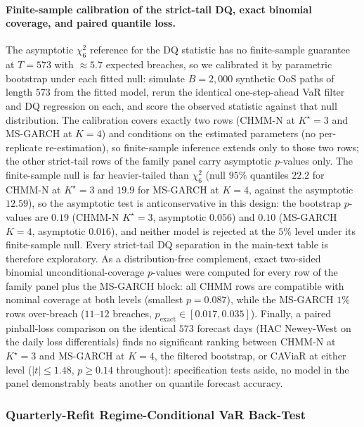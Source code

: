 \paragraph{Finite-sample calibration of the strict-tail DQ, exact binomial coverage, and paired quantile loss.}
The asymptotic $\chi^2_6$ reference for the DQ statistic has no finite-sample guarantee at $T = 573$ with $\approx 5.7$ expected breaches, so we calibrated it by parametric bootstrap under each fitted null: simulate $B = 2{,}000$ synthetic OoS paths of length $573$ from the fitted model, rerun the identical one-step-ahead VaR filter and DQ regression on each, and score the observed statistic against that null distribution. The calibration covers exactly two rows (CHMM-N at $K^\star = 3$ and MS-GARCH at $K = 4$) and conditions on the estimated parameters (no per-replicate re-estimation), so finite-sample inference extends only to those two rows; the other strict-tail rows of the family panel carry asymptotic $p$-values only. The finite-sample null is far heavier-tailed than $\chi^2_6$ (null $95\%$ quantiles $22.2$ for CHMM-N at $K^\star = 3$ and $19.9$ for MS-GARCH at $K = 4$, against the asymptotic $12.59$), so the asymptotic test is anticonservative in this design: the bootstrap $p$-values are $0.19$ (CHMM-N $K^\star = 3$, asymptotic $0.056$) and $0.10$ (MS-GARCH $K = 4$, asymptotic $0.016$), and neither model is rejected at the $5\%$ level under its finite-sample null. Every strict-tail DQ separation in the main-text table is therefore exploratory. As a distribution-free complement, exact two-sided binomial unconditional-coverage $p$-values were computed for every row of the family panel plus the MS-GARCH block: all CHMM rows are compatible with nominal coverage at both levels (smallest $p = 0.087$), while the MS-GARCH $1\%$ rows over-breach ($11$--$12$ breaches, $p_{\text{exact}} \in [0.017, 0.035]$). Finally, a paired pinball-loss comparison on the identical $573$ forecast days (HAC Newey-West on the daily loss differentials) finds no significant ranking between CHMM-N at $K^\star = 3$ and MS-GARCH at $K = 4$, the filtered bootstrap, or CAViaR at either level ($|t| \le 1.48$, $p \ge 0.14$ throughout): specification tests aside, no model in the panel demonstrably beats another on quantile forecast accuracy.


\subsubsection{Quarterly-Refit Regime-Conditional VaR Back-Test}
\label{sec:quarterly_refit_cond_var}

